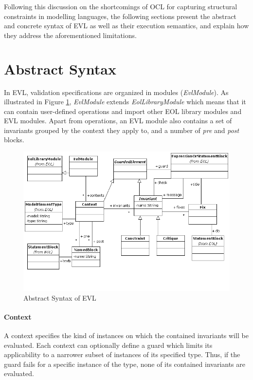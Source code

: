 \noindent Following this discussion on the shortcomings of OCL for capturing structural constraints in modelling languages, the following sections present the abstract and concrete syntax of EVL as well as their execution semantics, and explain how they address the aforementioned limitations.

\section{Abstract Syntax}

In EVL, validation specifications are organized in modules (\emph{EvlModule}). As illustrated in Figure \ref{fig:EvlAbstractSyntax}, \emph{EvlModule} extends \emph{EolLibraryModule} which means that it can contain user-defined operations and import other EOL library modules and EVL modules. Apart from operations, an EVL module also contains a set of invariants grouped by the context they apply to, and a number of \emph{pre} and \emph{post} blocks.

\begin{landscape}
\begin{figure}
	\centering
	\includegraphics{images/EvlAbstractSyntax.png}
	\caption{Abstract Syntax of EVL}
	\label{fig:EvlAbstractSyntax}
\end{figure}
\end{landscape}

\paragraph{Context} A context specifies the kind of instances on which the contained invariants will be evaluated. Each context can optionally define a guard which limits its applicability to a narrower subset of instances of its specified type. Thus, if the guard fails for a specific instance of the type, none of its contained invariants are evaluated.

